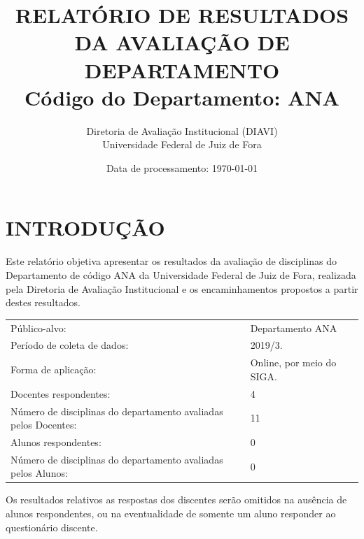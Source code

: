 \documentclass[a4paper,10pt]{article}
\date{Data de processamento: \today}
\begin{document}
\author{Diretoria de Avaliação Institucional (DIAVI) \\ Universidade Federal de Juiz de Fora}

\title{RELATÓRIO DE RESULTADOS DA AVALIAÇÃO DE DEPARTAMENTO\\ Código do Departamento: ANA}
\maketitle
\section{INTRODUÇÃO}
Este relatório objetiva apresentar os resultados da avaliação de disciplinas do Departamento     de código ANA da Universidade Federal de Juiz de Fora, realizada pela     Diretoria de Avaliação Institucional e os encaminhamentos propostos a     partir destes resultados.

\begin{center}
\begin{tabularx}{\linewidth}{X|l}

Público-alvo:& Departamento  ANA\\

Período de coleta de dados:& 2019/3.\\

Forma de aplicação:& Online, por meio do SIGA.\\

Docentes respondentes:& 4\\

Número de disciplinas do departamento avaliadas pelos Docentes:& 11\\

Alunos   respondentes:& 0\\

Número de disciplinas do departamento  avaliadas pelos   Alunos:& 0\\
\end{tabularx}
\end{center}

Os resultados relativos as respostas dos discentes serão omitidos na ausência de alunos respondentes, ou na eventualidade de somente um aluno responder ao questionário discente.
\end{document}
